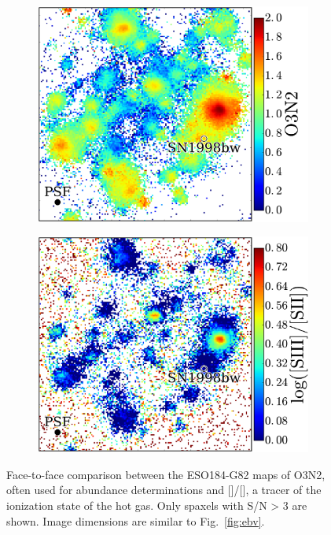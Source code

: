 \documentclass[traditabstract]{aa}
\newcommand{\sii}{[\ion{S}{ii}]}
\newcommand{\siii}{[\ion{S}{iii}]}
\begin{document}
\begin{figure}
\centering
\begin{subfigure}{.42\textwidth}
  \includegraphics[width=0.999\linewidth]{Figs/MUSE_SN1998bw_O3N2.pdf}
\end{subfigure}
\begin{subfigure}{.42\textwidth}
  \includegraphics[width=0.999\linewidth]{Figs/MUSE_SN1998bw_S3S2.pdf}
\end{subfigure}
\caption{Face-to-face comparison between the ESO184-G82 maps of O3N2, often used for abundance determinations and \siii/\sii, a tracer of the ionization state of the hot gas. Only spaxels with {S/N > 3} are shown. Image dimensions are similar to Fig.~\ref{fig:ebv}.}
\label{fig:s3s2}
\end{figure}
\end{document}
